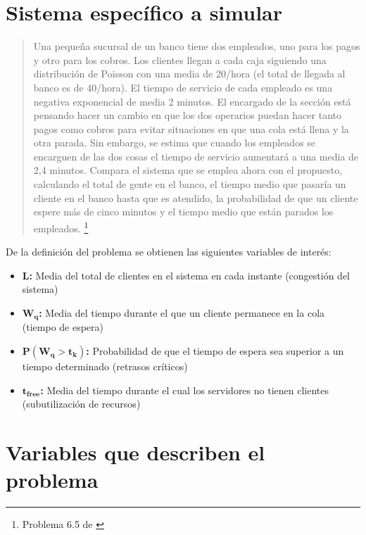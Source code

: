 \documentclass[letterpaper, 12pt]{report}
\begin{document}
\newpage

\section{Sistema específico a simular}

\begin{quote}
    Una pequeña sucursal de un banco tiene dos empleados, uno para los pagos y otro para los cobros. Los clientes llegan a 
cada caja siguiendo una distribución de Poisson con una media de 20/hora (el total de llegada al banco es de 40/hora). 
El tiempo de servicio de cada empleado es una negativa exponencial de media 2 minutos. El encargado de la sección está 
pensando hacer un cambio en que los dos operarios puedan hacer tanto pagos como cobros para evitar situaciones en que 
una cola está llena y la otra parada. Sin embargo, se estima que cuando los empleados se encarguen de las dos cosas 
el tiempo de servicio aumentará a una media de 2,4 minutos. Compara el sistema que se emplea ahora con el propuesto, 
calculando el total de gente en el banco, el tiempo medio que pasaría un cliente en el banco hasta que es atendido, 
la probabilidad de que un cliente espere más de cinco minutos y el tiempo medio que están parados los empleados. \footnote{Problema 6.5 de \cite{queue}}
\end{quote}

De la definición del problema se obtienen las siguientes variables de interés:
\begin{itemize}
    \item \textbf{L:} Media del total de clientes en el sistema en cada instante (congestión del sistema)
    \item \(\mathbf{W_q}\)\textbf{:} Media del tiempo durante el que un cliente permanece en la cola (tiempo de espera)
    \item \(\mathbf{P ( W_q > t_k)}\)\textbf{:} Probabilidad de que el tiempo de espera sea superior a un tiempo determinado (retrasos críticos)
    \item \(\mathbf{t_{free}}\)\textbf{:} Media del tiempo durante el cual los servidores no tienen clientes (subutilización de recursos)  
\end{itemize}


\section{Variables que describen el problema}
\end{document}

